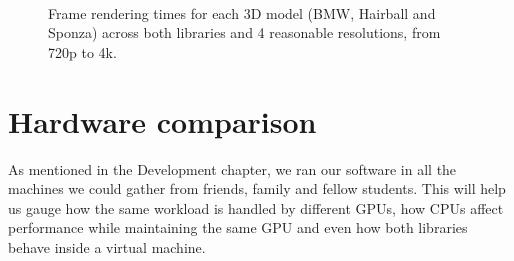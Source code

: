 \begin{figure}
    \\
    \centering
    \caption{Frame rendering times for each 3D model (BMW, Hairball and Sponza) across both libraries and 4 reasonable resolutions, from 720p to 4k.}
    \label{frametimes-overview-graph}
\end{figure}

\section{Hardware comparison}
As mentioned in the Development chapter, we ran our software in all the machines we could gather from friends, family and fellow students. This will help us gauge how the same workload is handled by different GPUs, how CPUs affect performance while maintaining the same GPU and even how both libraries behave inside a virtual machine.

